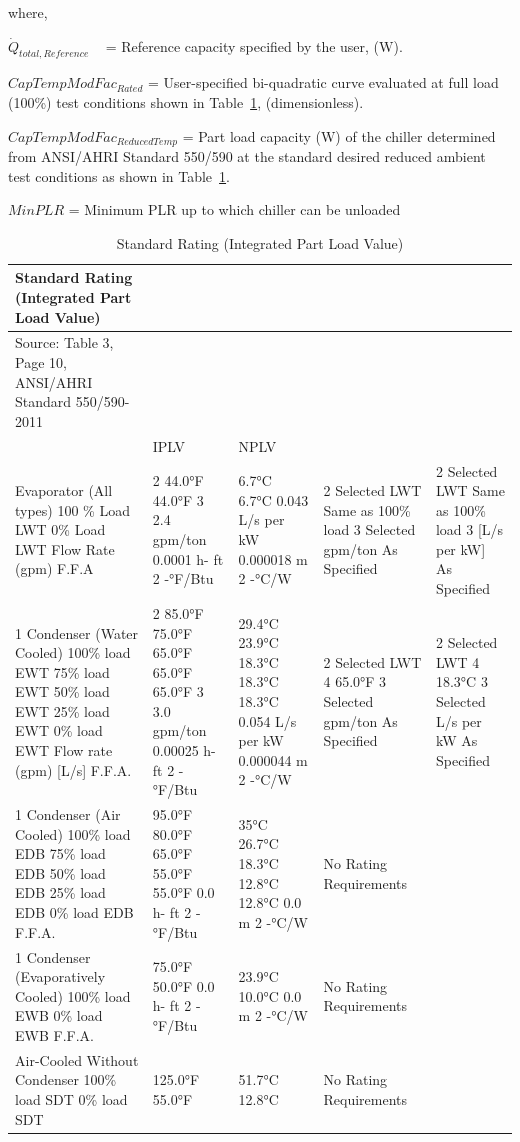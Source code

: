 where,

\({\dot Q_{total,Reference}}\) ~ = Reference capacity specified by the user, (W).

\(CapTempModFa{c_{Rated}}\) = User-specified bi-quadratic curve evaluated at full load (100\%) test conditions shown in Table~\ref{table:standard-rating-integrated-part-load-value}, (dimensionless).

\(CapTempModFa{c_{ReducedTemp}}\) = Part load capacity (W) of the chiller determined from ANSI/AHRI Standard 550/590 at the standard desired reduced ambient test conditions as shown in Table~\ref{table:standard-rating-integrated-part-load-value}.

\(MinPLR\) = Minimum PLR up to which chiller can be unloaded

\begin{longtable}[c]{p{1.2in}p{1.2in}p{1.2in}p{1.2in}p{1.2in}}
\caption{Standard Rating (Integrated Part Load Value) \protect \label{table:standard-rating-integrated-part-load-value}}\\
\toprule 
Standard Rating (Integrated Part Load Value) \tabularnewline \midrule
\endhead
Source: Table 3, Page 10, ANSI/AHRI Standard 550/590-2011 \tabularnewline
 & IPLV & NPLV \tabularnewline
Evaporator (All types)  100 \% Load LWT  0\% Load LWT  Flow Rate (gpm)  F.F.A & 2 44.0°F  44.0°F  3 2.4 gpm/ton  0.0001  h- ft 2 -°F/Btu & 6.7°C  6.7°C  0.043 L/s per  kW  0.000018  m 2 -°C/W & 2 Selected LWT  Same as 100\%  load  3 Selected  gpm/ton  As Specified & 2 Selected  LWT  Same as 100\%  load  3 [L/s per kW]  As Specified \tabularnewline
1 Condenser (Water  Cooled)  100\% load EWT  75\% load EWT  50\% load EWT  25\% load EWT  0\% load EWT  Flow rate (gpm) [L/s]  F.F.A. & 2 85.0°F  75.0°F  65.0°F  65.0°F  65.0°F  3 3.0 gpm/ton  0.00025  h- ft 2 -°F/Btu & 29.4°C  23.9°C  18.3°C  18.3°C  18.3°C  0.054 L/s per  kW  0.000044  m 2 -°C/W & 2 Selected LWT  4 65.0°F  3 Selected  gpm/ton  As Specified & 2 Selected LWT  4 18.3°C  3 Selected  L/s per kW  As Specified \tabularnewline
1 Condenser (Air Cooled)  100\% load EDB  75\% load EDB  50\% load EDB  25\% load EDB  0\% load EDB  F.F.A. & 95.0°F  80.0°F  65.0°F  55.0°F  55.0°F  0.0 h- ft 2  -°F/Btu & 35°C  26.7°C  18.3°C  12.8°C  12.8°C  0.0 m 2 -°C/W & No Rating Requirements \tabularnewline
1 Condenser  (Evaporatively Cooled)  100\% load EWB  0\% load EWB  F.F.A. & 75.0°F  50.0°F  0.0 h- ft 2  -°F/Btu & 23.9°C  10.0°C  0.0 m 2 -°C/W & No Rating Requirements \tabularnewline
Air-Cooled Without  Condenser  100\% load SDT  0\% load SDT & 125.0°F  55.0°F & 51.7°C  12.8°C & No Rating Requirements \tabularnewline

\end{longtable}
